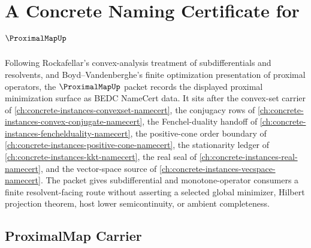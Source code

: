 \chapter{A Concrete Naming Certificate for $\ProximalMapUp$}
\label{ch:concrete-instances-proximal-map-namecert}

Following Rockafellar's convex-analysis treatment of subdifferentials and resolvents, and Boyd--Vandenberghe's finite optimization presentation of proximal operators, the $\ProximalMapUp$ packet records the displayed proximal minimization surface as BEDC NameCert data. It sits after the convex-set carrier of \autoref{ch:concrete-instances-convexset-namecert}, the conjugacy rows of \autoref{ch:concrete-instances-convex-conjugate-namecert}, the Fenchel-duality handoff of \autoref{ch:concrete-instances-fenchelduality-namecert}, the positive-cone order boundary of \autoref{ch:concrete-instances-positive-cone-namecert}, the stationarity ledger of \autoref{ch:concrete-instances-kkt-namecert}, the real seal of \autoref{ch:concrete-instances-real-namecert}, and the vector-space source of \autoref{ch:concrete-instances-vecspace-namecert}. The packet gives subdifferential and monotone-operator consumers a finite resolvent-facing route without asserting a selected global minimizer, Hilbert projection theorem, host lower semicontinuity, or ambient completeness.

\section{ProximalMap Carrier}
\label{sec:proximal-map-carrier}

